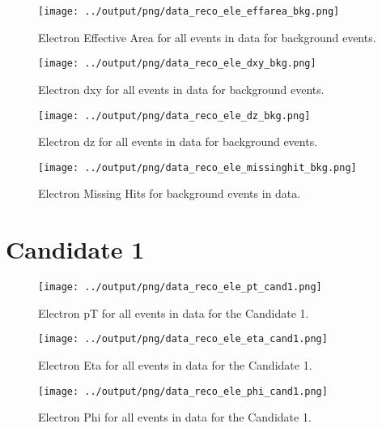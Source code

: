 \documentclass[11pt]{book}
\begin{document}
\begin{figure}[htb]
\centering
\texttt{[image: ../output/png/data\_reco\_ele\_effarea\_bkg.png]}
\caption{Electron Effective Area for all events in data for background events.}
\label{fig:data_ele_effarea_bkg}
\end{figure}

\begin{figure}[htb]
\centering
\texttt{[image: ../output/png/data\_reco\_ele\_dxy\_bkg.png]}
\caption{Electron dxy for all events in data for background events.}
\label{fig:data_ele_dxy_bkg}
\end{figure}

\begin{figure}[htb]
\centering
\texttt{[image: ../output/png/data\_reco\_ele\_dz\_bkg.png]}
\caption{Electron dz for all events in data for background events.}
\label{fig:data_ele_dz_bkg}
\end{figure}

\begin{figure}[htb]
\centering
\texttt{[image: ../output/png/data\_reco\_ele\_missinghit\_bkg.png]}
\caption{Electron Missing Hits for background events in data.}
\label{fig:data_ele_missinghĩt_bkg}
\end{figure}
\clearpage


\section{Candidate 1}

\begin{figure}[htb]
\centering
\texttt{[image: ../output/png/data\_reco\_ele\_pt\_cand1.png]}
\caption{Electron pT for all events in data for the Candidate 1.}
\label{fig:data_ele_pt_cand1}
\end{figure}

\begin{figure}[htb]
\centering
\texttt{[image: ../output/png/data\_reco\_ele\_eta\_cand1.png]}
\caption{Electron Eta for all events in data for the Candidate 1.}
\label{fig:data_ele_eta_cand1}
\end{figure}

\begin{figure}[htb]
\centering
\texttt{[image: ../output/png/data\_reco\_ele\_phi\_cand1.png]}
\caption{Electron Phi for all events in data for the Candidate 1.}
\label{fig:data_ele_phi_cand1}
\end{figure}
\end{document}
